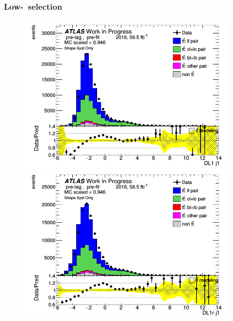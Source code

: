 \documentclass[letterpaper,12pt]{article}
\begin{document}
\subsubsection{Low-\pt\ selection}
\label{sec:appendix_lowpT_selection}
\begin{figure}[H]
\begin{minipage}[b]{.45\textwidth}
\centering
\includegraphics[width=1\textwidth]{Distribution_March/DataMC_J1_DL1.png}
\end{minipage}\hfill
\begin{minipage}[b]{.45\textwidth}
\centering
\includegraphics[width=1\textwidth]{Distribution_March/DataMC_J1_DL1r.png}
\end{minipage}\hfill
\begin{minipage}[b]{.45\textwidth}

\end{minipage}
\end{figure}
\end{document}
